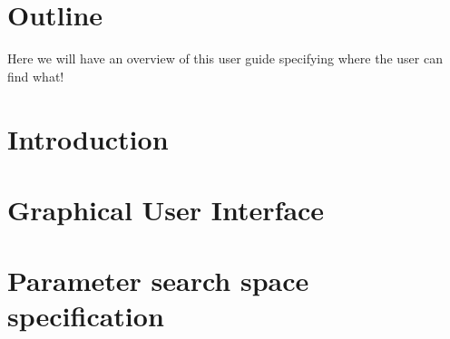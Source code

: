 \documentclass[twoside,a4paper]{refart}
\theoremstyle{dotless}
\newcounter{ex}
\begin{document}

	

\section{Outline}
\label{outline}
Here we will have an overview of this user guide specifying where the user can find what!

\section{Introduction}


\section{Graphical User Interface}


\newpage
\section{Parameter search space specification}
\label{parameter_spec}

\clearpage
\end{document}

